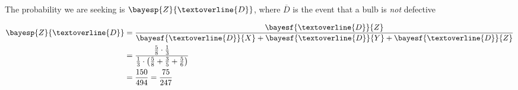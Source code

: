 \begin{solution}
   The probability we are seeking is $\bayesp{Z}{\textoverline{D}}$, where $\overline{D}$ 
   is the event that a bulb is \textit{not} defective
   
   \begin{align}
      \bayesp{Z}{\textoverline{D}} &= \dfrac{\bayesf{\textoverline{D}}{Z}}
      {\bayesf{\textoverline{D}}{X} + \bayesf{\textoverline{D}}{Y} + \bayesf{\textoverline{D}}{Z}} \\
      &= \dfrac{\frac{5}{8}\cdot\frac{1}{3}}{\frac{1}{3}\cdot\left(\frac{5}{8} +
      \frac{3}{5} + \frac{5}{6}\right)} \\
      &= \dfrac{150}{494} = \dfrac{75}{247}
   \end{align}
   
\end{solution}
